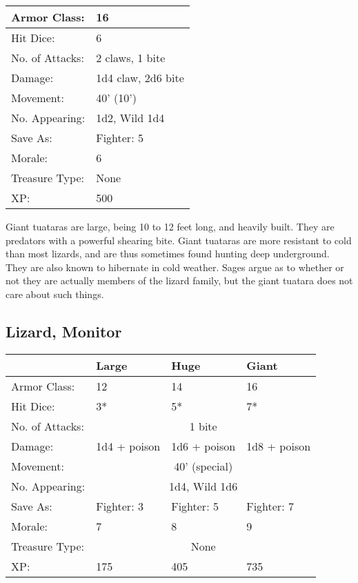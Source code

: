 \documentclass[a4paper,twoside,openany,10pt]{book}
\begin{document}
\begin{multicols}{2}
\begin{tabularx}{0.50\textwidth}{@{}lX@{}}
Armor Class: & 16 \\\hline
Hit Dice: & 6 \\\hline
No. of Attacks: & 2 claws, 1 bite \\\hline
Damage: & 1d4 claw, 2d6 bite \\\hline
Movement: & 40' (10') \\\hline
No. Appearing: & 1d2, Wild 1d4 \\\hline
Save As: & Fighter: 5 \\\hline
Morale: & 6 \\\hline
Treasure Type: & None \\\hline
XP: & 500 \\\hline
\end{tabularx}\medskip

Giant tuataras are large, being 10 to 12 feet long, and heavily built. They are predators with a powerful shearing bite. Giant tuataras are more resistant to cold than most lizards, and are thus sometimes found hunting deep underground. They are also known to hibernate in cold weather. Sages argue as to whether or not they are actually members of the lizard family, but the giant tuatara does not care about such things.

\subsection*{Lizard, Monitor}\label{lizard-monitor}

\begin{tabularx}{0.50\textwidth}{@{}lXXX@{}}
& Large & Huge & Giant \\\hline
Armor Class: & 12 & 14 & 16 \\\hline
Hit Dice: & 3* & 5* & 7* \\\hline
No. of Attacks: &  \multicolumn{3}{c}{1 bite} \\\hline
Damage: & 1d4 + poison & 1d6 + poison & 1d8 + poison \\\hline
Movement: & \multicolumn{3}{c}{40' (special)}\\\hline
No. Appearing: &  \multicolumn{3}{c}{1d4, Wild 1d6}\\\hline
Save As: & Fighter: 3 & Fighter: 5 & Fighter: 7 \\\hline
Morale: & 7 & 8 & 9 \\\hline
Treasure Type: & \multicolumn{3}{c}{None} \\\hline
XP: & 175 & 405 & 735 \\\hline
\end{tabularx}\medskip


\end{multicols}
\end{document}
